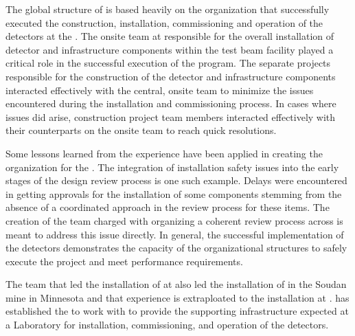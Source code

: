 The global structure of  is based heavily on 
the organization that successfully executed the construction,
installation, commissioning and operation of the 
detectors at the .  The onsite team at  
responsible for the overall installation of 
detector and infrastructure components within the test beam 
facility played a critical role in the successful execution of the 
 program.  The separate projects responsible for 
the construction of the detector and infrastructure components 
interacted effectively with the central, onsite team to minimize 
the issues encountered during the installation and commissioning 
process.  In cases where issues did arise, construction project 
team members interacted effectively with their counterparts on 
the onsite team to reach quick resolutions.

Some lessons learned from the  experience have 
been applied in creating the  organization for 
the  .  The integration of installation 
safety issues into the early stages of the design review process 
is one such example.  Delays were encountered in getting approvals 
for the installation of some  components stemming from 
the absence of a coordinated approach in the review process for 
these items.  The creation of the  team charged with 
organizing a coherent review process across  is 
meant to address this issue directly.  In general, the successful 
implementation of the  detectors demonstrates 
the capacity of the organizational structures to safely execute 
the project and meet performance requirements.

The team that led the installation of  at
 also led the installation of  in the Soudan
mine in Minnesota and that experience is extraploated to the
installation at .  has established the
 to work with  to provide the supporting
infrastructure expected at a Laboratory for installation,
commissioning, and operation of the  detectors.
